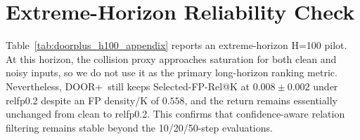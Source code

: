 \documentclass[10pt,journal,compsoc]{IEEEtran}
\newcommand{\method}{\textsc{DOOR}}
\newcommand{\doorplus}{\textsc{DOOR+}}
\begin{document}

\appendices
\section{Extreme-Horizon Reliability Check}

Table~\ref{tab:doorplus_h100_appendix} reports an extreme-horizon H=100 pilot. At this horizon, the collision proxy approaches saturation for both clean and noisy inputs, so we do not use it as the primary long-horizon ranking metric. Nevertheless, \doorplus\ still keeps Selected-FP-Rel@K at $0.008 \pm 0.002$ under relfp0.2 despite an FP density/K of $0.558$, and the return remains essentially unchanged from clean to relfp0.2. This confirms that confidence-aware relation filtering remains stable beyond the 10/20/50-step evaluations.

\begin{table}[!t]
\caption{Extreme-horizon H=100 pilot for trainable \doorplus\ on nuPlan 50k (2k validation samples per seed). Collision is near saturation, but false-positive filtering and return preservation remain stable.}
\label{tab:doorplus_h100_appendix}
\centering
{}
\end{table}
\end{document}
